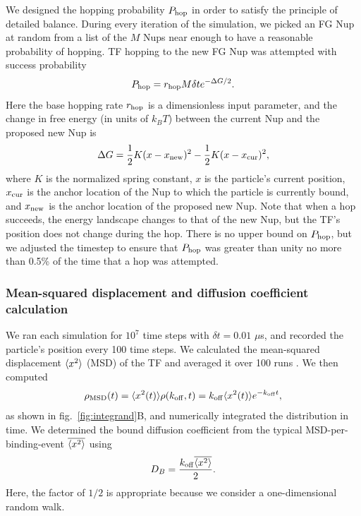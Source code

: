 We designed the hopping probability $P_{\rm hop}$ in order to satisfy the principle of detailed balance.  During every iteration of the simulation, we picked an FG Nup at random from a list of the $M$  Nups near enough to have a reasonable probability of hopping. TF hopping to the new FG Nup was attempted with success probability
\begin{equation}
P_{\rm hop} = r_{\mathrm{hop}} M \delta t e^{-\Delta G /2}.
\end{equation}
Here the base hopping rate $r_{\mathrm{hop}}$ is a dimensionless input parameter, and the change in free energy (in units of $k_BT$) between the current Nup and the proposed new Nup is
\begin{equation}
  \Delta G = \frac{1}{2} K (x-x_{\mathrm{new}})^2 - \frac{1}{2} K (x -
  x_{\mathrm{cur}})^2,
\end{equation}
where $K$ is the normalized spring constant, $x$ is the particle's current position, $x_{\mathrm{cur}}$ is the anchor location of the Nup to which the particle is currently bound, and $x_{\mathrm{new}}$ is the anchor location of the proposed new Nup. Note that when a hop succeeds, the energy landscape changes to that of the new Nup, but the TF's position does not change during the hop.  There is no upper bound on $P_{\rm hop}$, but we adjusted the timestep to ensure that $P_{\rm hop}$ was greater than
unity no more than 0.5\% of the time that a hop was attempted.

\subsubsection{Mean-squared displacement and diffusion coefficient calculation}
We ran each simulation for $10^7$ time steps with $\delta t = 0.01$ $\mu$s, and recorded the particle's position every 100 time steps.  We calculated the mean-squared displacement $\langle x^2 \rangle$ (MSD) of the TF and averaged it over 100 runs .  We then computed
\begin{equation}
\rho_{\mathrm{MSD}} (t)= \langle x^2(t) \rangle \rho(k_{\rm off},t) = k_{\rm off} \langle x^2(t) \rangle
e^{-k_{\rm off} t}, 
\end{equation}
as shown in fig.~\ref{fig:integrand}B, and numerically integrated the distribution in time. We determined the bound diffusion coefficient from the typical MSD-per-binding-event $\overline{\langle x^2 \rangle}$ using
\begin{equation}
D_B = \frac{k_{\rm off} \overline{\langle x^2 \rangle}}{2}. 
\end{equation}   
Here, the factor of $1/2$ is appropriate because we consider a one-dimensional random walk.

